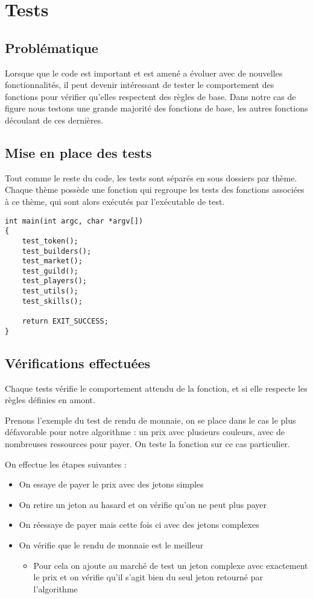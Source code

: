 \section{Tests}
\label{tests}

\subsection*{Problématique}

Lorsque que le code est important et est amené a évoluer avec de nouvelles fonctionnalités, il peut devenir intéressant de tester le comportement des fonctions pour vérifier qu'elles respectent des règles de base. Dans notre cas de figure nous testons une grande majorité des fonctions de base, les autres fonctions découlant de ces dernières.

\subsection{Mise en place des tests}

Tout comme le reste du code, les tests sont séparés en sous dossiers par thème. Chaque thème possède une fonction qui regroupe les tests des fonctions associées à ce thème, qui sont alors exécutés par l'exécutable de test.


\begin{lstlisting}[frame=single, caption={Exécution des tests}]
int main(int argc, char *argv[])
{
	test_token();
	test_builders();
	test_market();
	test_guild();
	test_players();
	test_utils();
	test_skills();
 
	return EXIT_SUCCESS;
}
\end{lstlisting}
\subsection{Vérifications effectuées}

Chaque tests vérifie le comportement attendu de la fonction, et si elle respecte les règles définies en amont. 

Prenons l'exemple du test de rendu de monnaie, on se place dans le cas le plus défavorable pour notre algorithme : un prix avec plusieurs couleurs, avec de nombreuses ressources pour payer. On teste la fonction sur ce cas particulier.

On effectue les étapes suivantes :
\begin{itemize}
    \item On essaye de payer le prix avec des jetons simples 
    \item On retire un jeton au hasard et on vérifie qu'on ne peut plus payer
    \item On réessaye de payer mais cette fois ci avec des jetons complexes
    \item On vérifie que le rendu de monnaie est le meilleur
    \begin{itemize}[label=*]
        \item Pour cela on ajoute au marché de test un jeton complexe avec exactement le prix et on vérifie qu'il s'agit bien du seul jeton retourné par l'algorithme
    \end{itemize}
\end{itemize}
